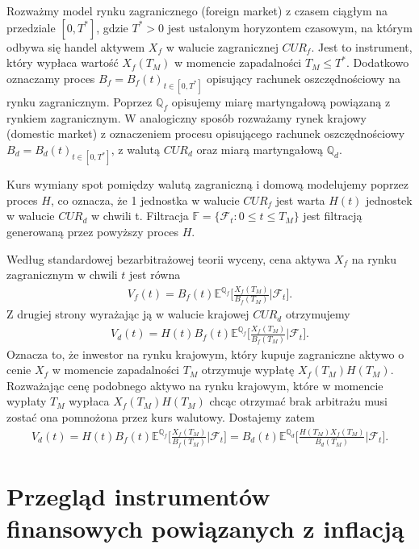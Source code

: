 \documentclass{mini}
\theoremstyle{mythstyle}
\begin{document}
Rozważmy model rynku zagranicznego (foreign market) z czasem ciągłym na przedziale $[0, T^*]$, gdzie $T^* >  0$ jest ustalonym horyzontem czasowym, na którym odbywa się handel aktywem  $X_f$ w walucie zagranicznej $CUR_f$. Jest to instrument, który wypłaca wartość $X_f(T_M)$ w momencie zapadalności $T_M \le T^* $. Dodatkowo oznaczamy proces $B_f = B_f(t)_{t \in [0,T^*]}$ opisujący rachunek oszczędnościowy na rynku zagranicznym. Poprzez $\mathbb{Q}_f$ opisujemy miarę martyngałową powiązaną z rynkiem zagranicznym. W analogiczny sposób rozważamy rynek krajowy (domestic market) z oznaczeniem procesu opisującego rachunek oszczędnościowy $B_d = B_d(t)_{t \in [0,T^*]}$, z walutą $CUR_d$ oraz miarą martyngałową $\mathbb{Q}_d$. 

Kurs wymiany spot pomiędzy walutą zagraniczną i domową modelujemy poprzez proces 
$H$, co oznacza, że 1 jednostka w walucie $CUR_f$ jest warta $H(t)$ jednostek w walucie $CUR_d$ w chwili t. Filtracja $\mathbb{F} = \{\mathcal{F}_t: 0 \le t \le T_M\}$ jest filtracją generowaną przez powyższy proces $H$.

Według standardowej bezarbitrażowej teorii wyceny, cena aktywa  $X_f$ na rynku zagranicznym w chwili $t$ jest równa
\begin{eqnarray}
	V_f(t) = B_f(t) \mathbb{E}^{\mathbb{Q}_f}\bigg[\frac{X_f(T_M)}{B_f(T_M)}\bigg|\mathcal{F}_t\bigg].
\end{eqnarray}
Z drugiej strony wyrażając ją w walucie krajowej $CUR_d$ otrzymujemy
\begin{eqnarray}
	V_d(t) = H(t) B_f(t) \mathbb{E}^{\mathbb{Q}_f}\bigg[\frac{X_f(T_M)}{B_f(T_M)}\bigg|\mathcal{F}_t\bigg].
\end{eqnarray}
Oznacza to, że inwestor na rynku krajowym, który kupuje zagraniczne aktywo o cenie $X_f$ w momencie zapadalności $T_M$ otrzymuje wypłatę $X_f(T_M) H(T_M)$. Rozważając cenę podobnego aktywo na rynku krajowym, które w momencie wypłaty $T_M$ wypłaca $X_f(T_M) H(T_M)$ chcąc otrzymać brak arbitrażu musi zostać ona pomnożona przez kurs walutowy. Dostajemy zatem
\begin{eqnarray}
	V_d(t) = H(t) B_f(t) \mathbb{E}^{\mathbb{Q}_f}\bigg[\frac{X_f(T_M)}{B_f(T_M)}\bigg|\mathcal{F}_t\bigg] = B_d(t) \mathbb{E}^{\mathbb{Q}_d} \bigg[ \frac{H(T_M)X_f(T_M)}{B_d(T_M)} \bigg| \mathcal{F}_t\bigg].
\end{eqnarray}

\chapter{Przegląd instrumentów finansowych powiązanych z inflacją}
\end{document}
